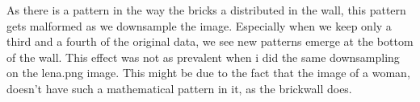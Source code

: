 \documentclass{article}
\begin{document}
As there is a pattern in the way the bricks a distributed in the wall, this pattern gets malformed as we downsample the image. Especially when we keep only a third and a fourth of the original data, we see new patterns emerge at the bottom of the wall.
This effect was not as prevalent when i did the same downsampling on the lena.png image. This might be due to the fact that the image of a woman, doesn't have such a mathematical pattern in it, as the brickwall does.
\end{document}
